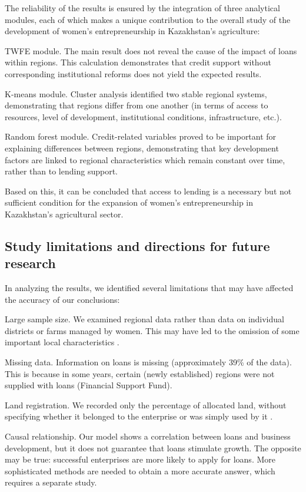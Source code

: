 \documentclass[pdflatex,sn-mathphys-ay]{sn-jnl}
\begin{document}
The reliability of the results is ensured by the integration of three
analytical modules, each of which makes a unique contribution to the
overall study of the development of women's entrepreneurship in
Kazakhstan's agriculture:

TWFE module. The main result does not reveal the cause of the impact of
loans within regions. This calculation demonstrates that credit support
without corresponding institutional reforms does not yield the expected
results.

K-means module. Cluster analysis identified two stable regional systems,
demonstrating that regions differ from one another (in terms of access
to resources, level of development, institutional conditions,
infrastructure, etc.).

Random forest module. Credit-related variables proved to be important
for explaining differences between regions, demonstrating that key
development factors are linked to regional characteristics which remain
constant over time, rather than to lending support.

Based on this, it can be concluded that access to lending is a necessary
but not sufficient condition for the expansion of women's
entrepreneurship in Kazakhstan's agricultural sector.

\subsection{Study limitations and directions for future research}

In analyzing the results, we identified several limitations that may
have affected the accuracy of our conclusions:

Large sample size. We examined regional data rather than data on
individual districts or farms managed by women. This may have led to the
omission of some important local characteristics \citep{ref36}.

Missing data. Information on loans is missing (approximately 39\% of the
data). This is because in some years, certain (newly established)
regions were not supplied with loans (Financial Support Fund).

Land registration. We recorded only the percentage of allocated land,
without specifying whether it belonged to the enterprise or was simply
used by it \citep{ref52}.

Causal relationship. Our model shows a correlation between loans and
business development, but it does not guarantee that loans stimulate
growth. The opposite may be true: successful enterprises are more likely
to apply for loans. More sophisticated methods are needed to obtain a
more accurate answer, which requires a separate study.
\end{document}
